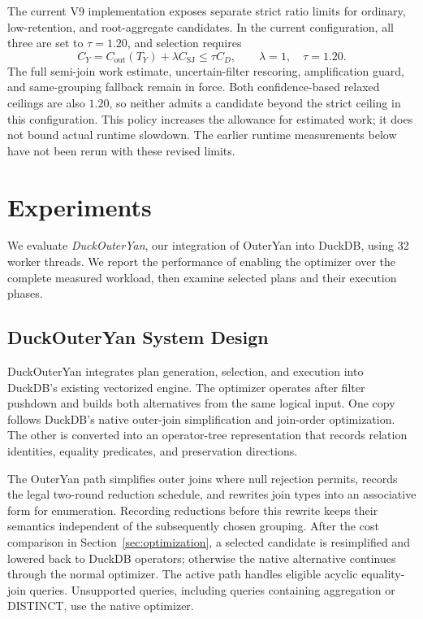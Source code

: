 The current V9 implementation exposes separate strict ratio limits for
ordinary, low-retention, and root-aggregate candidates. In the current
configuration, all three are set to $\tau=1.20$, and selection requires
\[
  C_Y = C_{\mathrm{out}}(T_Y)+\lambda C_{\mathrm{SJ}} \leq \tau C_D,
  \qquad \lambda=1,\quad \tau=1.20.
\]
The full semi-join work estimate, uncertain-filter rescoring, amplification
guard, and same-grouping fallback remain in force. Both confidence-based
relaxed ceilings are also $1.20$, so neither admits a candidate beyond the
strict ceiling in this configuration. This policy increases the allowance
for estimated work; it does not bound actual runtime slowdown. The earlier
runtime measurements below have not been rerun with these revised limits.

\section{Experiments}
\label{sec:experiments}

We evaluate \emph{DuckOuterYan}, our integration of OuterYan into DuckDB,
using 32 worker threads. We report the performance of enabling the optimizer
over the complete measured workload, then examine selected plans and their
execution phases.

\subsection{DuckOuterYan System Design}
\label{sec:system-design}

DuckOuterYan integrates plan generation, selection, and execution into
DuckDB's existing vectorized engine. The optimizer operates after filter
pushdown and builds both alternatives from the same logical input. One
copy follows DuckDB's native outer-join simplification and join-order
optimization. The other is converted into an operator-tree representation
that records relation identities, equality predicates, and preservation
directions.

The OuterYan path simplifies outer joins where null rejection permits,
records the legal two-round reduction schedule, and rewrites join types
into an associative form for enumeration. Recording reductions before this
rewrite keeps their semantics independent of the subsequently chosen
grouping. After the cost comparison in Section~\ref{sec:optimization}, a
selected candidate is resimplified and lowered back to DuckDB operators;
otherwise the native alternative continues through the normal optimizer.
The active path handles eligible acyclic equality-join queries. Unsupported
queries, including queries containing aggregation or DISTINCT, use the
native optimizer.

